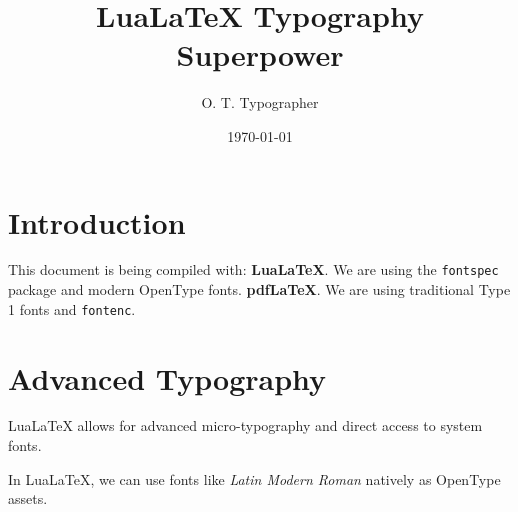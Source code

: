 \documentclass{otbook}
\title{LuaLaTeX Typography Superpower}
\author{O. T. Typographer}
\date{\today}
\begin{document}
\makeotbooktitle

\section{Introduction}

This document is being compiled with:
\ifluatex
    \textbf{LuaLaTeX}. We are using the \texttt{fontspec} package and modern OpenType fonts.
\else
    \textbf{pdfLaTeX}. We are using traditional Type 1 fonts and \texttt{fontenc}.
\fi

\section{Advanced Typography}

LuaLaTeX allows for advanced micro-typography and direct access to system fonts.

\begin{designrule}
    In LuaLaTeX, we can use fonts like \textit{Latin Modern Roman} natively as OpenType assets.
\end{designrule}
\end{document}
